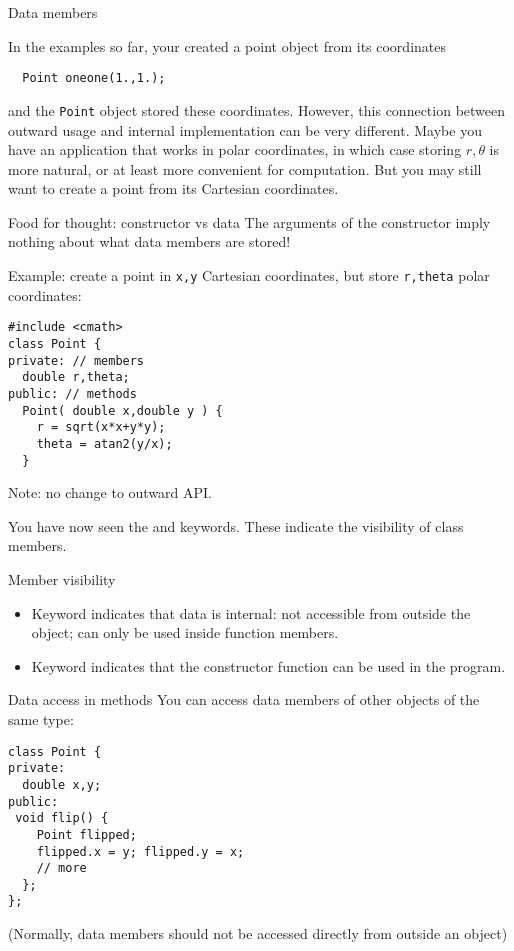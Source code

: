  {Data members}

In the examples so far, your created a point object from its coordinates
\begin{lstlisting}
  Point oneone(1.,1.);
\end{lstlisting}
and the \lstinline{Point} object stored these coordinates.
However, this connection between outward usage and internal implementation
can be very different.
Maybe you have an application that works in polar coordinates,
in which case storing $r,\theta$ is more natural,
or at least more convenient for computation.
But you may still want to create a point from its Cartesian coordinates.

\begin{block}{Food for thought: constructor vs data}
  \label{sl:class-set}
  The arguments of the constructor imply nothing about
  what data members are stored!

  Example: create a point in \lstinline{x,y} Cartesian coordinates,
  but store \lstinline{r,theta} polar coordinates:

  \lstset{style=snippetcode}
\begin{lstlisting}
#include <cmath>
class Point {
private: // members
  double r,theta;
public: // methods
  Point( double x,double y ) {
    r = sqrt(x*x+y*y);
    theta = atan2(y/x);
  }
\end{lstlisting}
Note: no change to outward API.
\end{block}

You have now seen the  and  keywords.
These indicate the visibility of class members.

\begin{plainblock}{Member visibility}
  \begin{itemize}
  \item Keyword  indicates that data is internal:
    not accessible from outside the object;
    can only be used inside function members.
  \item Keyword  indicates that the constructor
    function can be used in the program.
  \end{itemize}
\end{plainblock}

\begin{slide}{Data access in methods}
  \label{sl:member-access-proper}
  You can access data members of other objects of the same type:
  \lstset{style=snippetcode}
\begin{lstlisting}
class Point {
private:
  double x,y;
public:
 void flip() {
    Point flipped;
    flipped.x = y; flipped.y = x;
    // more
  };
};
\end{lstlisting}
  (Normally, data members should not be accessed directly from outside an object)
\end{slide}


